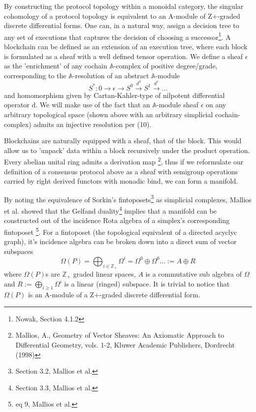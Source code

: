 \documentclass{article}
\begin{document}
By constructing the protocol topology within a monoidal category, the singular cohomology of a protocol topology is equivalent to an A-module of Z+-graded discrete differential forms. One can, in a natural way, assign a decision tree to any set of executions that captures the decision of choosing a successor\footnote{Nowak, Section 4.1.2}. A blockchain can be defined as an extension of an execution tree, where each block is formulated as a sheaf with a well defined tensor operation. We define a sheaf $\epsilon$ as the 'enrichment' of any cochain $\mathbb{A}$-complex of positive degree/grade, corresponding to the $\mathbb{A}$-resolution of an abstract $\mathbb{A}$-module
\begin{equation} \label{eq1}
S^*: 0 \rightarrow \epsilon \rightarrow S^0 \xrightarrow{d^0} S^1 \xrightarrow{d^1} \dots
\end{equation} \label{eq1}
and homomorphism given by  Cartan-Kahler-type of nilpotent differential operator d. We will make use of the fact that an $\mathbb{A}$-module sheaf $\epsilon$ on any arbitrary topological space (shown above with an arbitrary simplicial cochain-complex) admits an injective resolution per (10).

Blockchains are naturally equipped with a sheaf, that of the block.  This would allow us to 'unpack' data within a block recursively under the product operation. Every abelian unital ring admits a derivation map \footnote{Mallios, A., Geometry of Vector Sheaves: An Axiomatic Approach to Differential
Geometry, vols. 1-2, Kluwer Academic Publishers, Dordrecht (1998)}, thus if we reformulate our definition of a consensus protocol above as a sheaf with semigroup operations carried by right derived functors with monadic bind, we can form a manifold.

By noting the equivalence of Sorkin's fintoposets\footnote{Section 3.2, Mallios et al.} as simplicial complexes, Mallios et al. showed that the Gelfand duality\footnote{Section 3.3, Mallios et al.} implies that a manifold can be constructed out of the incidence Rota algebra of a simplex's corresponding fintoposet \footnote{eq 9, Mallios et al.}. For a fintoposet (the topological equivalent of a directed acyclyc graph), it's incidence algebra can be broken down into a direct sum of vector subspaces
\begin{equation} \label{eq1}
\Omega(P) = \bigoplus_{i \in \mathbb{Z}_+} \Omega^i = \Omega^0 \oplus \Omega^0 \dots := A \oplus R
\end{equation} \label{eq1}
where $\Omega(P)$s are $\mathbb{Z}_+$ graded linear spaces, $A$ is a commutative sub algebra of $\Omega$ and $R := \bigoplus_{i \geq 1} \Omega^i$ is a linear (ringed) subspace. It is trivial to notice that $\Omega(P)$ is an A-module of a Z+-graded discrete differential form. 
\end{document}
